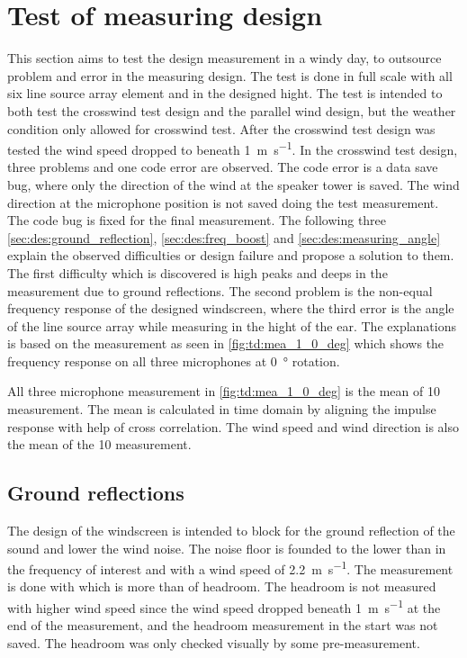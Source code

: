 \section{Test of measuring design}\label{sec:ds:test_of_mes_des}
This section aims to test the design measurement in a windy day, to outsource problem and error in the measuring design. The test is done in full scale with all six line source array element and in the designed hight. The test is intended to both test the crosswind test design and the parallel wind design, but the weather condition only allowed for crosswind test. After the crosswind test design was tested the wind speed dropped to beneath \SI{1}{\meter\per\second}.
In the crosswind test design, three problems and one code error are observed. The code error is a data save bug, where only the direction of the wind at the speaker tower is saved. The wind direction at the microphone position is not saved doing the test measurement. The code bug is fixed for the final measurement. The following three \autoref{sec:des:ground_reflection}, \autoref{sec:des:freq_boost} and \autoref{sec:des:measuring_angle} explain the observed difficulties or design failure and propose a solution to them. The first difficulty which is discovered is high peaks and deeps in the measurement due to ground reflections. The second problem is the non-equal frequency response of the designed windscreen, where the third error is the angle of the line source array while measuring in the hight of the ear.  
The explanations is based on the measurement as seen in \autoref{fig:td:mea_1_0_deg} which shows the frequency response on all three microphones at \SI{0}{\degree} rotation.


All three microphone measurement in \autoref{fig:td:mea_1_0_deg} is the mean of 10 measurement. The mean is calculated in time domain by aligning the impulse response with help of cross correlation. The wind speed and wind direction is also the mean of the 10 measurement.


\subsection{Ground reflections}\label{sec:des:ground_reflection}
The design of the windscreen is intended to block for the ground reflection of the sound and lower the wind noise. The noise floor is founded to the lower than  in the frequency of interest and with a wind speed of \SI{2.2}{\meter\per\second}. The measurement is done with  which is more than  of headroom. The headroom is not measured with higher wind speed since the wind speed dropped beneath  \SI{1}{\meter\per\second} at the end of the measurement, and the headroom measurement in the start was not saved. The headroom was only checked visually by some pre-measurement.

